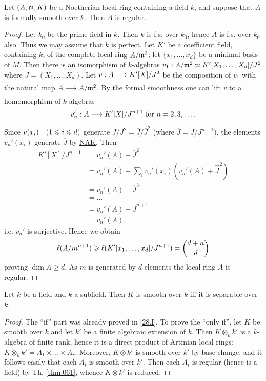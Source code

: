 \documentclass[../main]{subfiles}
\begin{document}
\begin{partheorem}\label{thm:061}
Let $(A, \mathfrak{m}, K)$ be a Noetherian local ring containing a field $k$, and suppose that $A$ is formally smooth over $k$. Then $A$ is regular.
\end{partheorem}
\begin{proof}
 Let $k_0$ be the prime field in $k$. Then $k$ is f.s. over $k_0$, hence $A$ is f.s. over $k_0$ also. Thus we may assume that $k$ is perfect. Let $K'$ be a coefficient field, containing $k$, of the complete local ring $A/\mathfrak{m}^2$; let $\{x_1, \ldots, x_d\}$ be a minimal basis of $M$. Then there is an isomorphism of $k$-algebras $v_1: A/\mathfrak{m}^2 \simeq K'[X_1, \dots, X_d] / J^2$ where $J=(X_1, \ldots, X_d)$. Let $v: A \varrightarrow{} K'[X] / J^2$ be the composition of $v_1$ with the natural map $A \varrightarrow{} A/\ideal{m}^2$. By the formal smoothness one can lift $v$ to a homomorphism of $k$-algebras \[v'_n: A \varrightarrow{} K'[X] / J^{n+1}\text{ for }n= 2,3, \ldots .\] Since $v(x_i)\for{1 \leqslant i \leqslant d}$ generate $J / J^2=\overline{J} / \overline{J}^2$ (where $\overline{J}=J / J^{n+1})$, the elements $v_n'(x_i)$ generate $\overline{J}$ by \hyperref[NAK]{NAK}. Then \[
 \begin{aligned}
 K'[X] / J^{n+1}&=v_n'(A)+\overline{J}^2\\&=v_n'(A)+\sum_i v_n'(x_i)(v_n'(A)+\vec{J}^2)\\&=v_n'(A)+\overline{J}^3\\&=\ldots\\&=v_n'(A)+\overline{J}^{n+1}\\&=v_n'(A),\end{aligned}\] i.e. $v_n'$ is surjective. Hence we obtain \[\ell(A / m^{n+1}) \geqslant \ell(K'[x_1, \dots, x_d] / J^{n+1})= \binom{d+n}{d}\]proving $\dim A \geqslant d$. As $m$ is generated by $d$ elements the local ring $A$ is regular.
\end{proof}

\begin{partheorem}\label{thm:062}
Let $k$ be a field and $k$ a subfield. Then $K$ is smooth over $k$ iff it is separable over $k$.
\end{partheorem}

\begin{proof} 
 The ``if'' part was already proved in \ref{28.I}. To prove the ``only if'', let $K$ be smooth over $k$ and let $k'$ be a finite algebraic extension of $k$. Then $K \otimes_k k'$ is a $k$-algebra of finite rank, hence it is a direct product of Artinian local rings: $K \otimes_k k'=A_1 \times \ldots \times A_r$. Moreover, $K \otimes k'$ is smooth over $k'$ by base change, and it follows easily that each $A_i$ is smooth over $k'$. Then each $A_i$ is regular (hence is a field) by Th. \ref{thm:061}, whence $K \otimes k'$ is reduced.
\end{proof}
\end{document}
